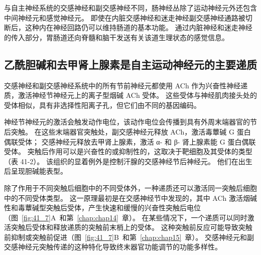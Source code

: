 与自主神经系统的交感神经和副交感神经不同，肠神经丛除了运动神经元外还包含中间神经元和感觉神经元。
即使在内脏交感神经和迷走神经副交感神经通路被切断后，这种内在神经回路仍可以维持肠道的基本功能。
通过内脏神经和迷走神经的传入部分，胃肠道还向脊髓和脑干发送有关该道生理状态的感觉信息。



\subsection{乙酰胆碱和去甲肾上腺素是自主运动神经元的主要递质}

交感神经和副交感神经系统中的所有节前神经元都使用 ACh 作为兴奋性神经递质，激活神经节神经元上的离子型烟碱 ACh 受体。
这些受体与神经肌肉接头处的受体相似，具有非选择性阳离子孔，但它们由不同的基因编码。


神经节神经元的激活会触发动作电位，该动作电位会传播到具有外周末端器官的节后突触。
在这些末端器官突触处，副交感神经元释放 ACh，激活毒蕈碱 G 蛋白偶联受体；
交感神经元释放去甲肾上腺素，激活 α- 和 β- 肾上腺素能 G 蛋白偶联受体。
突触后作用可以是兴奋性的或抑制性的，这取决于靶细胞及其受体的类型（表 41-2）。
该组织的显着例外是控制汗腺的交感神经节后神经元。 他们在出生后呈现胆碱能表型。


除了作用于不同突触后细胞中的不同受体外，一种递质还可以激活同一突触后细胞中的不同受体类型。
这一原理最初是在交感神经节中发现的，其中 ACh 激活烟碱性和毒蕈碱型突触后受体，产生快速和缓慢的兴奋性突触后电位（图~\ref{fig:41_7}A~和第~\ref{chap:chap14}~章）。
在某些情况下，一个递质可以同时激活突触后受体和释放递质的突触前末梢上的受体。
这种突触前反应可能导致突触前抑制或突触前促进（图~\ref{fig:41_7}B~和第~\ref{chap:chap15}~章）。
交感神经元和副交感神经元突触传递的这种特化导致终末器官功能调节的功能多样性。



